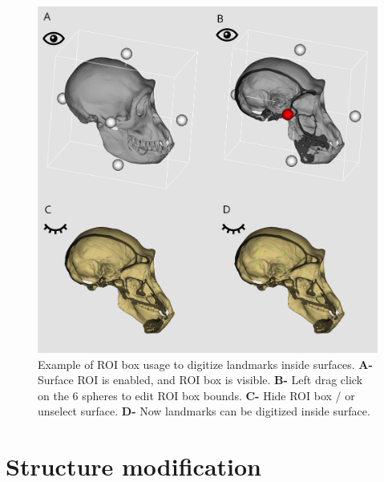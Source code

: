 \begin{figure}
  \centering
  \includegraphics[scale=0.25]{images/09/edit_surface/example_surface_roi.png} 
	\caption{Example of ROI box usage to digitize landmarks inside surfaces. \textbf{A-} Surface ROI is enabled, and ROI box is visible. \textbf{B-} Left drag click on the 6 spheres to edit ROI box bounds.  \textbf{C-} Hide ROI box / or unselect surface. \textbf{D-} Now landmarks can be digitized inside surface.}
\label{example_surface_roi}
 
\end{figure}


\section{Structure modification}
